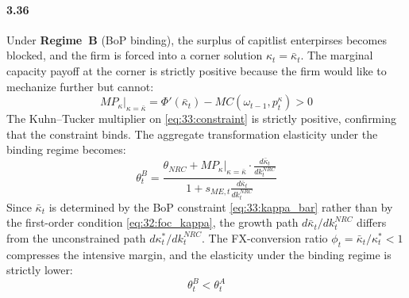 \paragraph{3.36}
Under \textbf{Regime~B} (BoP binding), the surplus of capitlist enterpirses becomes blocked, and the firm is forced
into a corner solution $\kappa_t = \bar{\kappa}_t$. The
marginal capacity payoff at the corner is strictly positive
because the firm would like to mechanize further but cannot:
\begin{equation}
	MP_\kappa\big|_{\kappa=\bar{\kappa}}
	= \Phi'(\bar{\kappa}_t) - MC(\omega_{t-1}, p^\kappa_t) > 0
	\label{eq:33:MP_corner}
\end{equation}
The Kuhn--Tucker multiplier on \eqref{eq:33:constraint} is
strictly positive, confirming that the constraint binds. The
aggregate transformation elasticity under the binding regime
becomes:
\begin{equation}
	\theta^{B}_t
	= \frac{\theta_{NRC}
		+ MP_\kappa\big|_{\kappa=\bar{\kappa}}
		\cdot \frac{d\bar{\kappa}_t}{dk^{NRC}_t}}
	{1 + s_{ME,t}\frac{d\bar{\kappa}_t}{dk^{NRC}_t}}
	\label{eq:33:theta_B}
\end{equation}
Since $\bar{\kappa}_t$ is determined by the BoP constraint
\eqref{eq:33:kappa_bar} rather than by the first-order
condition \eqref{eq:32:foc_kappa}, the growth path
$d\bar{\kappa}_t / dk^{NRC}_t$ differs from the unconstrained
path $d\kappa_t^* / dk^{NRC}_t$. The FX-conversion ratio
$\phi_t = \bar{\kappa}_t / \kappa_t^* < 1$ compresses the
intensive margin, and the elasticity under the binding regime
is strictly lower:
\begin{equation}
	\theta^{B}_t < \theta^{A}_t
	\label{eq:33:theta_inequality}
\end{equation}

